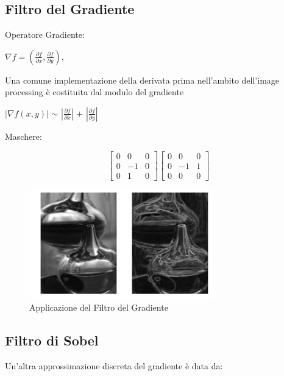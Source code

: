 \subsection{Filtro del Gradiente}

Operatore Gradiente:

\begin{center}
    $\nabla f=(\frac{\partial{f}}{\partial{x}},
        \frac{\partial{f}}{\partial{y}})$,
\end{center}

Una comune implementazione della derivata prima nell'ambito dell'image
processing è costituita dal modulo del gradiente

\begin{center}
    $| \nabla f(x,y) |$ $\sim$ $|\frac{\partial{f}}{\partial{x}}|$ $+$
    $|\frac{\partial{f}}{\partial{y}}|$
\end{center}

Maschere:

\begin{center}
    \[
        \begin{bmatrix}
            0 & 0  & 0 \\
            0 & -1 & 0 \\
            0 & 1  & 0
        \end{bmatrix}
        \begin{bmatrix}
            0 & 0  & 0 \\
            0 & -1 & 1 \\
            0 & 0  & 0
        \end{bmatrix}
    \]
\end{center}

\begin{figure}[H]
    \centering
    \includegraphics[width=8cm, keepaspectratio]{capitoli/immagini/imgs/gradiente.png}
    \caption{Applicazione del Filtro del Gradiente}
\end{figure}

\subsection{Filtro di Sobel}
Un'altra approssimazione discreta del gradiente è data da:

